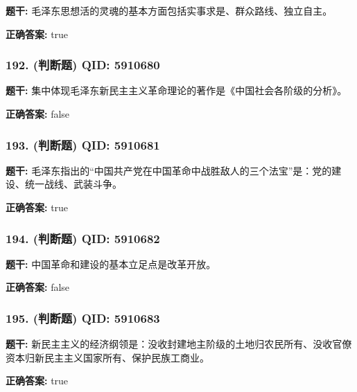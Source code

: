 \documentclass[12pt,UTF8]{ctexart}
\begin{document}
\textbf{题干:}
毛泽东思想活的灵魂的基本方面包括实事求是、群众路线、独立自主。

\textbf{正确答案:}
true

\vspace{0.3em}\hrulefill\vspace{0.7em}

\subsubsection*{192. (判断题) \small QID: 5910680}

\textbf{题干:}
集中体现毛泽东新民主主义革命理论的著作是《中国社会各阶级的分析》。

\textbf{正确答案:}
false

\vspace{0.3em}\hrulefill\vspace{0.7em}

\subsubsection*{193. (判断题) \small QID: 5910681}

\textbf{题干:}
毛泽东指出的“中国共产党在中国革命中战胜敌人的三个法宝”是：党的建设、统一战线、武装斗争。

\textbf{正确答案:}
true

\vspace{0.3em}\hrulefill\vspace{0.7em}

\subsubsection*{194. (判断题) \small QID: 5910682}

\textbf{题干:}
中国革命和建设的基本立足点是改革开放。

\textbf{正确答案:}
false

\vspace{0.3em}\hrulefill\vspace{0.7em}

\subsubsection*{195. (判断题) \small QID: 5910683}

\textbf{题干:}
新民主主义的经济纲领是：没收封建地主阶级的土地归农民所有、没收官僚资本归新民主主义国家所有、保护民族工商业。

\textbf{正确答案:}
true
\end{document}
